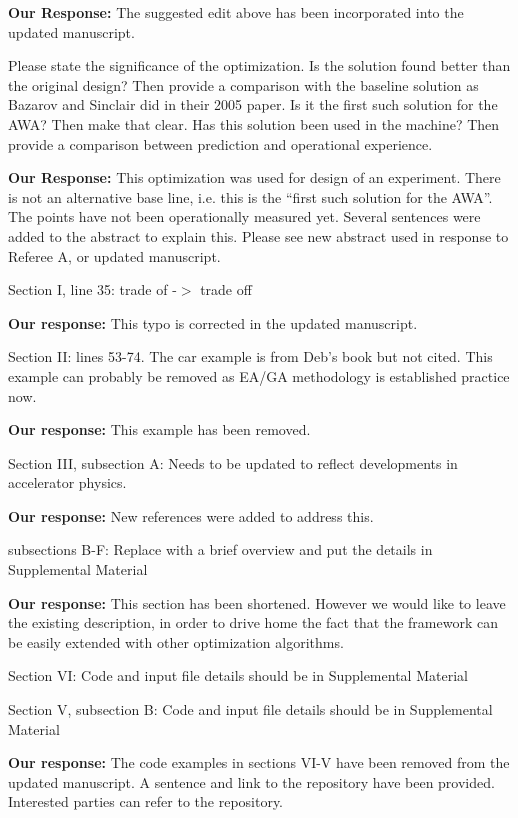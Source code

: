 \documentclass{article}
\begin{document}
{\bf Our Response:} {\color{blue} The suggested edit above has been incorporated into the updated manuscript. }

Please state
the significance of the optimization. Is the solution found better
than the original design? Then provide a comparison with the baseline
solution as Bazarov and Sinclair did in their 2005 paper. Is it the
first such solution for the AWA? Then make that clear. Has this
solution been used in the machine? Then provide a comparison between
prediction and operational experience.

{\bf Our Response:} {\color{blue} This optimization was used for design of 
an experiment. There is not an alternative base line, i.e. this is the 
``first such solution for the AWA''. The points have not been operationally measured yet.
Several sentences were added to the abstract to explain this. 
Please see new abstract used in response to Referee A, or updated manuscript.
}

Section I, line 35: trade of -$>$ trade off

{\bf Our response:} {\color{blue} This typo is corrected in the updated manuscript.}

Section II:
lines 53-74. The car example is from Deb’s book but not cited. This
example can probably be removed as EA/GA methodology is established
practice now.

{\bf Our response:} {\color{blue} This example has been removed.}

Section III, subsection A:
Needs to be updated to reflect developments in accelerator physics.

{\bf Our response:} {\color{blue} New references were added to address this.}

subsections B-F:
Replace with a brief overview and put the details in Supplemental
Material

{\bf Our response: } {\color{blue} This section has been shortened. However we would like to 
leave the existing description, in order to drive home the fact that the framework can be 
easily extended with other optimization algorithms.}

Section VI: 
Code and input file details should be in Supplemental Material

Section V, subsection B:
Code and input file details should be in Supplemental Material

{\bf Our response:} {\color{blue} The code examples in sections VI-V have been removed from the updated manuscript. 
	A sentence and link to the repository have been provided. Interested parties can refer to the repository.}
\end{document}
